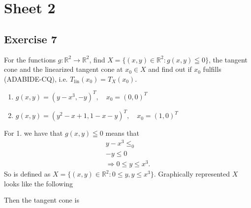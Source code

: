 


\maketitle
\tableofcontents
\section{Sheet 2}
\subsection{Exercise 7}
For the functions $g:\mathbb{R}^{2}\to \mathbb{R}^{2}$, find $X =
\{(x,y)\in\mathbb{R}^{2}: g(x, y)\leqq 0\} $, the tangent cone and the
linearized tangent cone at $x_0 \in X$ and find out if $x_0$ fulfills
(ADABIDE-CQ), i.e. $T_\text{lin}(x_0) = T_X(x_0)$.
\begin{enumerate}
    \item $g(x,y) = (y-x^{3}, -y)^{T},\quad x_0=(0,0)^{T}$
    \item $g(x,y) = (y^{2}-x+1, 1-x-y)^{T},\quad x_0=(1,0)^{T}$
\end{enumerate}
For 1. we have that $g(x,y)\leqq 0$ means that
\begin{align}
    y-x^{3}\le_0\\
    -y \le 0\\
    \Rightarrow 0\le y\le x^{3}.
\end{align}
So is defined as $X = \{\left( x,y \right) \in \mathbb{R}^{2}: 0\le y, y\le
x^{3}\}$. Graphically represented $X$ looks like the following
\begin{figure}[H]
    \centering
    \label{fig: ex7.1}
\end{figure}
Then the tangent cone is
